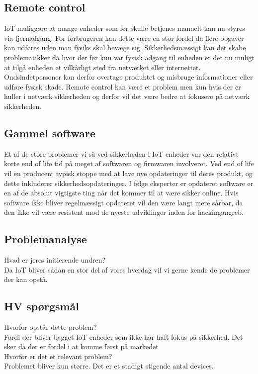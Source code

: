     \subsection{Remote control}
    IoT muliggøre at mange enheder som før skulle betjenes manuelt kan nu styres via fjernadgang. For forbrugeren kan dette være en stor fordel da flere opgaver kan udføres uden man fysiks skal bevæge sig. Sikkerhedsmæssigt kan det skabe problematikker da hvor der før kun var fysisk adgang til enheden er det nu muligt at tilgå enheden et vilkårligt sted fra netværket eller internettet. Ondsindetpersoner kan derfor overtage produktet og misbruge informationer eller udføre fysisk skade. Remote control kan være et problem men kun hvis der er huller i netværk sikkerheden og derfor vil det være bedre at fokusere på netværk sikkerheden.
    \subsection{Gammel software}
    Et af de store problemer vi så ved sikkerheden i IoT enheder var den relativt korte end of life tid på meget af softwaren og firmwaren involveret. Ved end of life vil en producent typisk stoppe med at lave nye opdateringer til deres produkt, og dette inkluderer sikkerhedsopdateringer. I følge eksperter er opdateret software er en af de absolut vigtigste ting %
    når det kommer til at være sikker online. \autocite{soups2015} Hvis software ikke bliver regelmæssigt opdateret vil den være langt mere sårbar, da den ikke vil være resistent mod de nyeste udviklinger inden for hackingangreb.
    \subsection{Problemanalyse}
    Hvad er jeres initierende undren?\\
    Da IoT bliver sådan en stor del af vores hverdag vil vi gerne kende de problemer der kan opstå.\\
    
    
    
    \subsection{HV spørgsmål}
    Hvorfor opstår dette problem?\\
    Fordi der bliver bygget IoT enheder som ikke har haft fokus på sikkerhed. Det sker da der er fordel i at komme først på markedet\\
    Hvorfor er det et relevant problem? \\
    Problemet bliver kun større. Det er et stadigt stigende antal devices.
    
